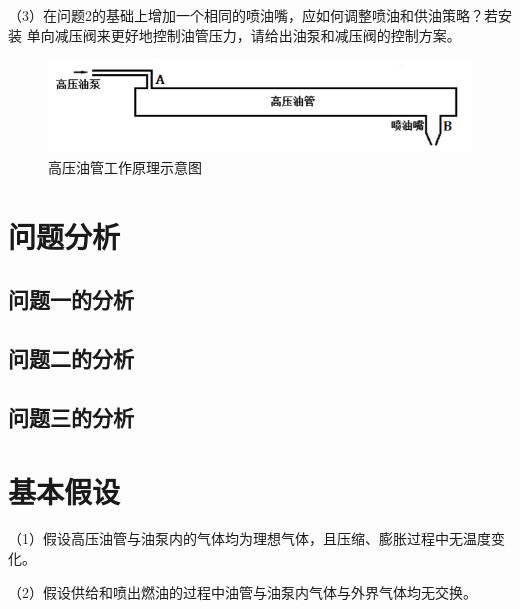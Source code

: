 \documentclass[withoutpreface,bwprint]{cumcmthesis} %
\begin{document}
（3）在问题2的基础上增加一个相同的喷油嘴，应如何调整喷油和供油策略？若安装
    单向减压阀来更好地控制油管压力，请给出油泵和减压阀的控制方案。

\begin{figure}[!h]
    \centering
    \includegraphics[width=.8\textwidth]{figure1.png}
    \caption{高压油管工作原理示意图}
    \label{figure1}
\end{figure}

\section{问题分析}
\subsection{问题一的分析}   


\subsection{问题二的分析}
        

\subsection{问题三的分析}
        
     

\section{基本假设}
（1）假设高压油管与油泵内的气体均为理想气体，且压缩、膨胀过程中无温度变化。

（2）假设供给和喷出燃油的过程中油管与油泵内气体与外界气体均无交换。    
\end{document}
